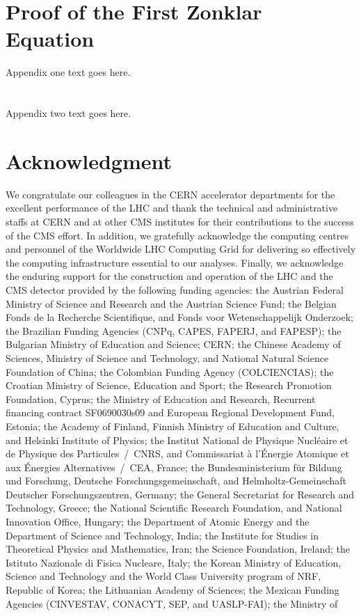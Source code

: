 \documentclass[journal]{IEEEtran}
\begin{document}
\appendices
\section{Proof of the First Zonklar Equation}
Appendix one text goes here.

\section{}
Appendix two text goes here.


\section*{Acknowledgment}
 We congratulate our colleagues in the CERN accelerator departments for the excellent performance of the LHC and thank the technical and administrative staffs at CERN and at other CMS institutes for their contributions to the success of the CMS effort. In addition, we gratefully acknowledge the computing centres and personnel of the Worldwide LHC Computing Grid for delivering so effectively the computing infrastructure essential to our analyses. Finally, we acknowledge the enduring support for the construction and operation of the LHC and the CMS detector provided by the following funding agencies: the Austrian Federal Ministry of Science and Research and the Austrian Science Fund; the Belgian Fonds de la Recherche Scientifique, and Fonds voor Wetenschappelijk Onderzoek; the Brazilian Funding Agencies (CNPq, CAPES, FAPERJ, and FAPESP); the Bulgarian Ministry of Education and Science; CERN; the Chinese Academy of Sciences, Ministry of Science and Technology, and National Natural Science Foundation of China; the Colombian Funding Agency (COLCIENCIAS); the Croatian Ministry of Science, Education and Sport; the Research Promotion Foundation, Cyprus; the Ministry of Education and Research, Recurrent financing contract SF0690030s09 and European Regional Development Fund, Estonia; the Academy of Finland, Finnish Ministry of Education and Culture, and Helsinki Institute of Physics; the Institut National de Physique Nucl\'eaire et de Physique des Particules~/~CNRS, and Commissariat \`a l'\'Energie Atomique et aux \'Energies Alternatives~/~CEA, France; the Bundesministerium f\"ur Bildung und Forschung, Deutsche Forschungsgemeinschaft, and Helmholtz-Gemeinschaft Deutscher Forschungszentren, Germany; the General Secretariat for Research and Technology, Greece; the National Scientific Research Foundation, and National Innovation Office, Hungary; the Department of Atomic Energy and the Department of Science and Technology, India; the Institute for Studies in Theoretical Physics and Mathematics, Iran; the Science Foundation, Ireland; the Istituto Nazionale di Fisica Nucleare, Italy; the Korean Ministry of Education, Science and Technology and the World Class University program of NRF, Republic of Korea; the Lithuanian Academy of Sciences; the Mexican Funding Agencies (CINVESTAV, CONACYT, SEP, and UASLP-FAI); the Ministry of 
\end{document}
